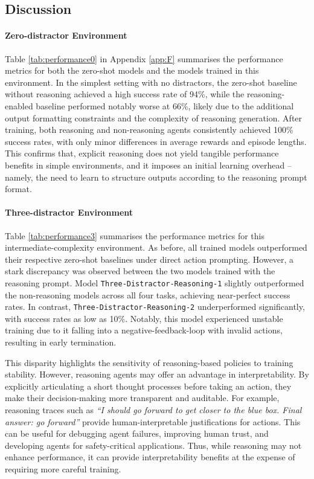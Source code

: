 \documentclass[11pt,a4paper]{article}
\begin{document}
\subsection{Discussion}
\paragraph{Zero-distractor Environment}
Table \ref{tab:performance0} in Appendix \ref{app:F} summarises the performance metrics for both the zero-shot models and the models trained in this environment. In the simplest setting with no distractors, the zero-shot baseline without reasoning achieved a high success rate of 94\%, while the reasoning-enabled baseline performed notably worse at 66\%, likely due to the additional output formatting constraints and the complexity of reasoning generation. After training, both reasoning and non-reasoning agents consistently achieved 100\% success rates, with only minor differences in average rewards and episode lengths. This confirms that, explicit reasoning does not yield tangible performance benefits in simple environments, and it imposes an initial learning overhead -- namely, the need to learn to structure outputs according to the reasoning prompt format.
\paragraph{Three-distractor Environment}
Table \ref{tab:performance3} summarises the performance metrics for this intermediate-complexity environment. As before, all trained models outperformed their respective zero-shot baselines under direct action prompting. However, a stark discrepancy was observed between the two models trained with the reasoning prompt. Model \texttt{Three-Distractor-Reasoning-1} slightly outperformed the non-reasoning models across all four tasks, achieving near-perfect success rates. In contrast, \texttt{Three-Distractor-Reasoning-2} underperformed significantly, with success rates as low as 10\%. Notably, this model experienced unstable training due to it falling into a negative-feedback-loop with invalid actions, resulting in early termination.

This disparity highlights the sensitivity of reasoning-based policies to training stability. However, reasoning agents may offer an advantage in interpretability. By explicitly articulating a short thought processes before taking an action, they make their decision-making more transparent and auditable. For example, reasoning traces such as \textit{``I should go forward to get closer to the blue box. Final answer: go forward''} provide human-interpretable justifications for actions. This can be useful for debugging agent failures, improving human trust, and developing agents for safety-critical applications. Thus, while reasoning may not enhance performance, it can provide interpretability benefits at the expense of requiring more careful training.
\end{document}
